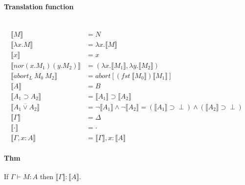 \documentclass[12 pt]{article}
\begin{document}
       \paragraph{Translation function}~
       \begin{align*}
         \llbracket M \rrbracket & = N
         \\ \llbracket \lambda x. M \rrbracket & = \lambda x. \llbracket M \rrbracket
         \\ \llbracket x \rrbracket & = x
         \\ \llbracket nor (x.M_1) (y.M_2) \rrbracket & = (\lambda x. \llbracket M_1 \rrbracket, \lambda y.\llbracket M_2 \rrbracket)
         \\ \llbracket abort_L\ M_0\ M_2 \rrbracket & = abort [(fst\ \llbracket M_0 \rrbracket)\llbracket M_1 \rrbracket]
         \\ \llbracket A \rrbracket & = B
         \\ \llbracket A_1 \supset A_2 \rrbracket & = \llbracket A_1 \rrbracket \supset \llbracket A_2 \rrbracket
         \\ \llbracket A_1 \overline{\lor} A_2 \rrbracket & = \neg \llbracket A_1 \rrbracket \land \neg \llbracket A_2 \rrbracket = (\llbracket A_1 \rrbracket \supset \perp) \land (\llbracket A_2 \rrbracket \supset \perp)
         \\ \llbracket \Gamma \rrbracket & = \Delta
         \\ \llbracket \cdot \rrbracket & = \cdot
         \\ \llbracket \Gamma, x:A \rrbracket & = \llbracket \Gamma \rrbracket, x:\llbracket A \rrbracket
       \end{align*}
       \paragraph{Thm} If $\Gamma \vdash M:A$ then $\llbracket \Gamma
       \rrbracket : \llbracket A \rrbracket$.
\end{document}
